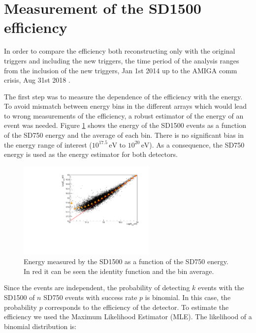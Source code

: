 \documentclass[12pt,a4paper]{article}
\newcommand{\eV}{\, \mathrm{eV}}
\begin{document}

\section{Measurement of the SD1500 efficiency}
\label{sec:efficiency}

In order to compare the efficiency both reconstructing only with the original triggers and including the new triggers, the time period of the analysis ranges from the inclusion of the new triggers, Jan 1st 2014 up to the AMIGA comm crisis, Aug 31st 2018 \cite{GAPAmigaComms}.

The first step was to measure the dependence of the efficiency with the energy. To avoid mismatch between energy bins in the different arrays which would lead to wrong measurements of the efficiency, a robust estimator of the energy of an event was needed. Figure \ref{fig:energy} shows the energy of the SD1500 events as a function of the SD750 energy and the average of each bin. There is no significant bias in the energy range of interest ($10^{17.5}\eV$ to $10^{20}\eV$). As a consequence, the SD750 energy is used as the energy estimator for both detectors.

\begin{figure}[]
    \begin{center}
        \includegraphics[width=0.6\textwidth]{plots/energy45.pdf}  
        \caption{Energy measured by the SD1500 as a function of the SD750 energy. In red it can be seen the identity function and the bin average.
        \label{fig:energy}}
        \vspace{-0.5cm}
    \end{center}
\end{figure} 

Since the events are independent, the probability of detecting $k$ events with the SD1500 of $n$ SD750 events with success rate $p$ is binomial. In this case, the probability $p$ corresponds to the efficiency of the detector. To estimate the efficiency we used the Maximum Likelihood Estimator (MLE). The likelihood of a binomial distribution is:
\end{document}
